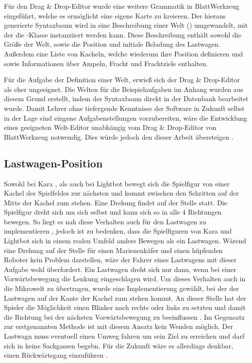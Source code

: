 Für den Drag \& Drop-Editor wurde eine weitere Grammatik in BlattWerkzeug eingeführt, welche es ermöglicht eine eigene Karte zu kreieren. Der hieraus generierte Syntaxbaum wird in eine Beschreibung einer Welt () umgewandelt, mit der die -Klasse instanziiert werden kann. Diese Beschreibung enthält sowohl die Größe der Welt, sowie die Position und initiale Beladung des Lastwagen. Außerdem eine Liste von Kacheln, welche wiederum ihre Position definieren und sowie Informationen über Ampeln, Fracht und Frachtziele enthalten.

Für die Aufgabe der Definition einer Welt, erwieß sich der Drag \& Drop-Editor als eher ungeeignet. Die Welten für die Beispielaufgaben im Anhang  wurden aus diesem Grund erstellt, indem der Syntaxbaum direkt in der Datenbank bearbeitet wurde. Damit Lehrer ohne tiefergende Kenntnisse der Software in Zukunft selbst in der Lage sind eingene Aufgabenstellungen vorzubereiten, wäre die Entwicklung eines geeigneten Welt-Editor unabhängig vom Drag \& Drop-Editor von BlattWerkzeug notwendig. Dies würde jedoch den  dieser Arbeit übersteigen .

\subsection{Lastwagen-Position}
\label{sec:implementation:rendering:truck-position}

Sowohl bei Kara , als auch bei Lightbot  bewegt sich die Spielfigur von einer Kachel des Spielfeldes zur nächsten und kommt zwischen den Schritten auf der Mitte der Kachel zum stehen. Eine Drehung findet auf der Stelle statt. Die Spielfigur dreht sich um sich selbst und kann sich so in alle 4 Richtungen bewegen. So liegt es nah diese Verhalten auch für den Lastwagen zu implementieren , jedoch ist zu bedenken, dass die Spielfiguren von Kara und Lightbot sich in einem realen Umfeld anders Bewegen als ein Lastwagen. Wärend eine Drehung auf der Stelle für einen Marienenkäfer und einen hüpfenden Roboter kein Problem darstellen, wäre der Fahrer eines Lastwagens mit dieser Aufgabe wohl überfordert. Ein Lastwagen dreht sich nur dann, wenn bei einer Vorwärtsbewegung die Lenkung eingeschlagen wird. Um dieses Verhalten auch in die Mikrowelt zu übertragen, wurde eine Implementierung gewählt, bei der der Lastwagen auf der Kante der Kachel zum stehen kommt. An dieser Stelle hat der Spieler die Möglichkeit einen Blinker nach rechts oder links zu setzten und damit die Richtung bei der nächsten Vorwärtsbewegung zu beeinflussen . Im Gegensatz zur erstgenannten Methode ist mit diesem Ansatz kein Wenden möglich. Der Lastwagn muss eventuell einen Umweg fahren um sein Ziel zu erreichen und darf sich in keine Sackgassen begebn. Für die Zukunft wäre es allerdings denkbar, einen Rückwärtsgang einzuführen .

